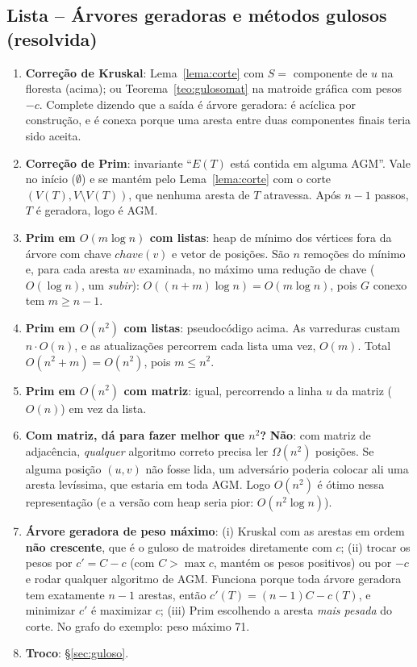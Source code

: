 \subsection{Lista -- Árvores geradoras e métodos gulosos (resolvida)}\label{sec:listaagm}
\begin{enumerate}
  \item \textbf{Correção de Kruskal}: Lema~\ref{lema:corte} com $S=$ componente de $u$ na floresta (acima); ou Teorema~\ref{teo:gulosomat} na matroide gráfica com pesos $-c$. Complete dizendo que a saída é árvore geradora: é acíclica por construção, e é conexa porque uma aresta entre duas componentes finais teria sido aceita.
  \item \textbf{Correção de Prim}: invariante ``$E(T)$ está contida em alguma AGM''. Vale no início ($\emptyset$) e se mantém pelo Lema~\ref{lema:corte} com o corte $(V(T),V\setminus V(T))$, que nenhuma aresta de $T$ atravessa. Após $n-1$ passos, $T$ é geradora, logo é AGM.
  \item \textbf{Prim em $O(m\log n)$ com listas}: heap de mínimo dos vértices fora da árvore com chave $chave(v)$ e vetor de posições. São $n$ remoções do mínimo e, para cada aresta $uv$ examinada, no máximo uma redução de chave ($O(\log n)$, um \emph{subir}): $O((n+m)\log n)=O(m\log n)$, pois $G$ conexo tem $m\ge n-1$.
  \item \textbf{Prim em $O(n^2)$ com listas}: pseudocódigo acima. As varreduras custam $n\cdot O(n)$, e as atualizações percorrem cada lista uma vez, $O(m)$. Total $O(n^2+m)=O(n^2)$, pois $m\le n^2$.
  \item \textbf{Prim em $O(n^2)$ com matriz}: igual, percorrendo a linha $u$ da matriz ($O(n)$) em vez da lista.
  \item \textbf{Com matriz, dá para fazer melhor que $n^2$?} \textbf{Não}: com matriz de adjacência, \emph{qualquer} algoritmo correto precisa ler $\Omega(n^2)$ posições. Se alguma posição $(u,v)$ não fosse lida, um adversário poderia colocar ali uma aresta levíssima, que estaria em toda AGM. Logo $O(n^2)$ é ótimo nessa representação (e a versão com heap seria pior: $O(n^2\log n)$).
  \item \textbf{Árvore geradora de peso máximo}: (i) Kruskal com as arestas em ordem \textbf{não crescente}, que é o guloso de matroides diretamente com $c$; (ii) trocar os pesos por $c'=C-c$ (com $C>\max c$, mantém os pesos positivos) ou por $-c$ e rodar qualquer algoritmo de AGM. Funciona porque toda árvore geradora tem exatamente $n-1$ arestas, então $c'(T)=(n-1)C-c(T)$, e minimizar $c'$ é maximizar $c$; (iii) Prim escolhendo a aresta \emph{mais pesada} do corte. No grafo do exemplo: peso máximo 71.
  \item \textbf{Troco}: §\ref{sec:guloso}.
\end{enumerate}

